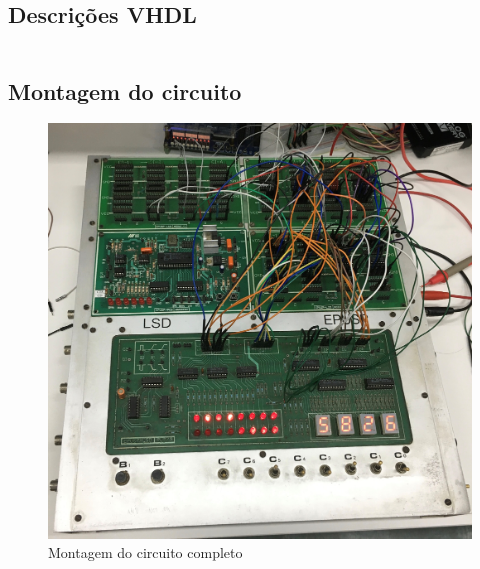 \documentclass[a4,12pt]{horizon-theme}
\newenvironment{code}{\captionsetup{type=listing}}{}
\begin{document}
\subsection{Descrições VHDL}
\label{ap:vhdl}

\begin{code}
\label{lst:uc}
\vspace{-12pt}
\inputminted[frame=lines, framesep=6pt, framerule=0.5pt, linenos, rulecolor=secondaryColor, breaklines]{VHDL}{unidade_controle.vhd}
\end{code}

\subsection{Montagem do circuito}
\label{ap:montagem}

\begin{figure}[!ht]
    \centering
    \includegraphics[width=\textwidth, trim={4cm 8cm 6cm 0}, clip]{montagem.jpg}
    \caption{Montagem do circuito completo}
    \label{fig:montagem}
\end{figure}

% 
% 

\horizonBackCover
\end{document}
